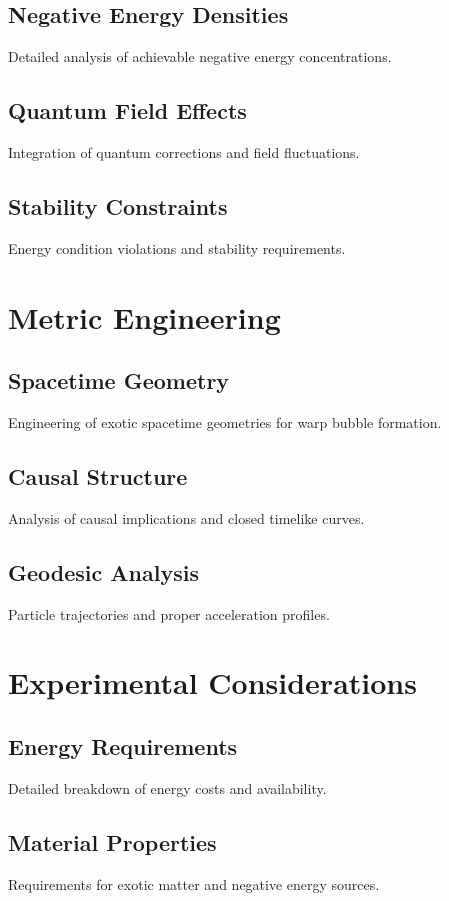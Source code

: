 \documentclass{article}
\begin{document}
\subsection{Negative Energy Densities}
Detailed analysis of achievable negative energy concentrations.

\subsection{Quantum Field Effects}
Integration of quantum corrections and field fluctuations.

\subsection{Stability Constraints}
Energy condition violations and stability requirements.

\section{Metric Engineering}

\subsection{Spacetime Geometry}
Engineering of exotic spacetime geometries for warp bubble formation.

\subsection{Causal Structure}
Analysis of causal implications and closed timelike curves.

\subsection{Geodesic Analysis}
Particle trajectories and proper acceleration profiles.

\section{Experimental Considerations}

\subsection{Energy Requirements}
Detailed breakdown of energy costs and availability.

\subsection{Material Properties}
Requirements for exotic matter and negative energy sources.
\end{document}
